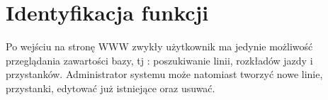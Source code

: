 \section{Identyfikacja funkcji}


Po wejściu na stronę WWW zwykły użytkownik ma jedynie możliwość przeglądania zawartości bazy, tj : poszukiwanie linii, rozkładów jazdy i przystanków. Administrator systemu może natomiast tworzyć nowe linie, przystanki, edytować już istniejące oraz usuwać. 